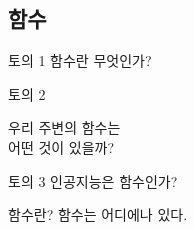 \documentclass{beamer}
\theoremstyle{definition}
\numberwithin{theorem}{section}
\begin{document}
\subsection{함수}





\begin{frame}{토의 1}
\centering
\Huge
   {함수}란 무엇인가?
\end{frame}




\begin{frame}{토의 2}
\setlength{\itemsep}{12pt} %

\Huge
\centering
  우리 주변의 {함수}는 \\
  \vspace{0.3cm}
  어떤 것이 있을까?




\end{frame}



\begin{frame}{토의 3}
\centering
\Huge
인공지능은 함수인가?    
\end{frame}




\begin{frame}{함수란?}
\centering
\Huge
   {함수}는 어디에나 있다.
\end{frame}
\end{document}
